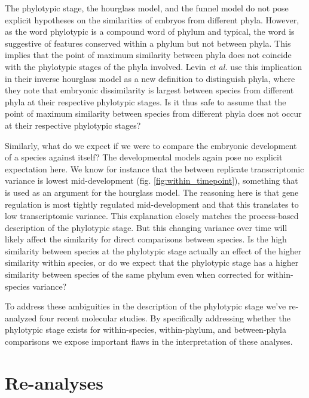 The phylotypic stage, the hourglass model, and the funnel model do not pose explicit hypotheses on the similarities of embryos from different phyla. However, as the word phylotypic is a compound word of phylum and typical, the word is suggestive of features conserved within a phylum but not between phyla. This implies that the point of maximum similarity between phyla does not coincide with the phylotypic stages of the phyla involved. Levin \textit{et al.}\cite{Levin2016} use this implication in their inverse hourglass model as a new definition to distinguish phyla, where they note that embryonic dissimilarity is largest between species from different phyla at their respective phylotypic stages. Is it thus safe to assume that the point of maximum similarity between species from different phyla does not occur at their respective phylotypic stages? 

Similarly, what do we expect if we were to compare the embryonic development of a species against itself? The developmental models again pose no explicit expectation here. We know for instance that the between replicate transcriptomic variance is lowest mid-development (fig. \ref{fig:within_timepoint}), something that is used as an argument for the hourglass model\cite{Liu2020, Uchida2022}. The reasoning here is that gene regulation is most tightly regulated mid-development and that this translates to low transcriptomic variance. This explanation closely matches the process-based description of the phylotypic stage. But this changing variance over time will likely affect the similarity for direct comparisons between species. Is the high similarity between species at the phylotypic stage actually an effect of the higher similarity within species, or do we expect that the phylotypic stage has a higher similarity between species of the same phylum even when corrected for within-species variance?

To address these ambiguities in the description of the phylotypic stage we've re-analyzed four recent molecular studies. By specifically addressing whether the phylotypic stage exists for within-species, within-phylum, and between-phyla comparisons we expose important flaws in the interpretation of these analyses.

\section{Re-analyses}


